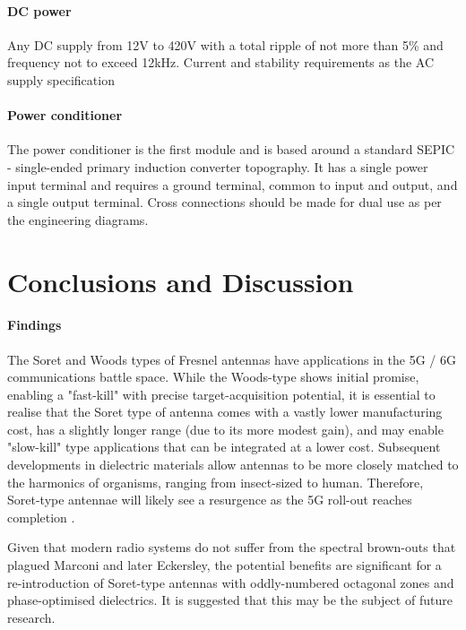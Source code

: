 \documentclass[review]{elsarticle}
\begin{document}
\paragraph{DC power} Any DC supply from 12V to 420V with a total ripple of not more than 5\% and frequency not to exceed 12kHz. Current and stability requirements as the AC supply specification
\paragraph{Power conditioner} The power conditioner is the first module and is based around a standard SEPIC - single-ended primary induction converter topography. It has a single power input terminal and requires a ground terminal, common to input and output, and a single output terminal. Cross connections should be made for dual use as per the engineering diagrams.

\section{Conclusions and Discussion}
\paragraph{Findings}
The Soret and Woods types of Fresnel antennas have applications in the 5G / 6G communications battle space. While the Woods-type shows initial promise, enabling a "fast-kill" with precise target-acquisition potential, it is essential to realise that the Soret type of antenna comes with a vastly lower manufacturing cost, has a slightly longer range (due to its more modest gain), and may enable "slow-kill" type applications that can be integrated at a lower cost. \cite{KimChen2021} Subsequent developments in dielectric materials allow antennas to be more closely matched to the harmonics of organisms, ranging from insect-sized to human. Therefore, Soret-type antennae will likely see a resurgence as the 5G roll-out reaches completion \cite{Wallace2023}. 

Given that modern radio systems do not suffer from the spectral brown-outs that plagued Marconi and later Eckersley, the potential benefits are significant for a re-introduction of Soret-type antennas with oddly-numbered octagonal zones and phase-optimised dielectrics. It is suggested that this may be the subject of future research.


\end{document}
